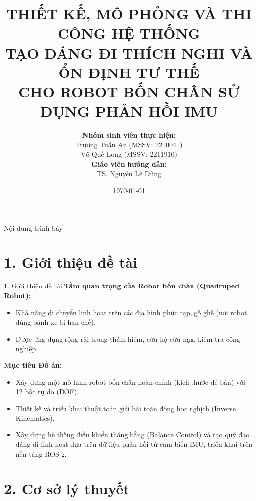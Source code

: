 \documentclass[10pt,aspectratio=169]{beamer}
\title[Đồ án Tốt nghiệp]{THIẾT KẾ, MÔ PHỎNG VÀ THI CÔNG HỆ THỐNG \\ TẠO DÁNG ĐI THÍCH NGHI VÀ ỔN ĐỊNH TƯ THẾ \\ CHO ROBOT BỐN CHÂN SỬ DỤNG PHẢN HỒI IMU}
\author[Tuấn An, Quế Long]{%
    \textbf{Nhóm sinh viên thực hiện:}\\
    Trương Tuấn An (MSSV: 2210041) \\
    Võ Quế Long (MSSV: 2211910) \\
    \vspace{0.3cm}
    \textbf{Giáo viên hướng dẫn:}\\
    TS. Nguyễn Lê Dũng
}
\institute[HCMUT]{
    Trường Đại học Bách Khoa TP. HCM \\
    Khoa Điện - Điện tử \\
    Bộ môn Điều khiển Tự động
}
\date{\today}
\begin{document}
\begin{frame}[plain]
    \titlepage
\end{frame}

\begin{frame}{Nội dung trình bày}
    \tableofcontents
\end{frame}

\section{1. Giới thiệu đề tài}

\begin{frame}{1. Giới thiệu đề tài}
    \textbf{Tầm quan trọng của Robot bốn chân (Quadruped Robot):}
    \begin{itemize}
        \item Khả năng di chuyển linh hoạt trên các địa hình phức tạp, gồ ghề (nơi robot dùng bánh xe bị hạn chế).
        \item Được ứng dụng rộng rãi trong thám hiểm, cứu hộ cứu nạn, kiểm tra công nghiệp.
    \end{itemize}
    \vspace{0.3cm}
    \textbf{Mục tiêu Đồ án:}
    \begin{itemize}
        \item Xây dựng một mô hình robot bốn chân hoàn chỉnh (kích thước để bàn) với 12 bậc tự do (DOF).
        \item Thiết kế và triển khai thuật toán giải bài toán động học nghịch (Inverse Kinematics).
        \item Xây dựng hệ thống điều khiển thăng bằng (Balance Control) và tạo quỹ đạo dáng đi linh hoạt dựa trên dữ liệu phản hồi từ cảm biến IMU, triển khai trên nền tảng ROS 2.
    \end{itemize}
\end{frame}

\section{2. Cơ sở lý thuyết}
\end{document}
